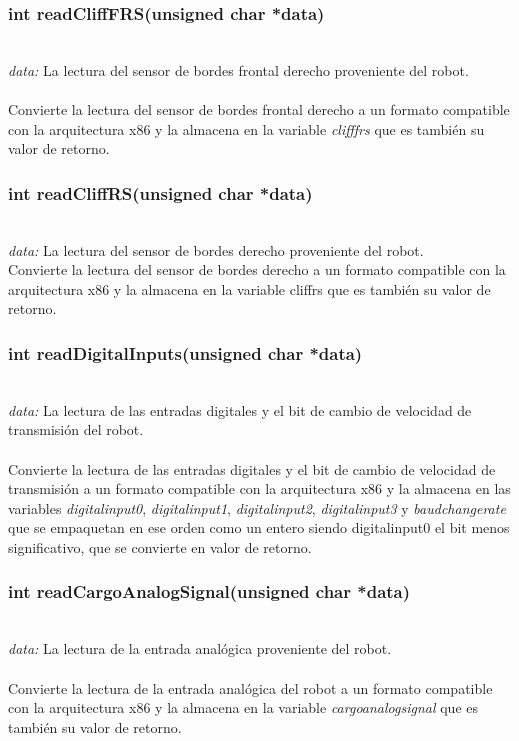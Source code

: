 \documentclass[letterpaper]{book}
\begin{document}
\subsubsection{int readCliffFRS(unsigned char *data)}\mbox{}\\
\emph{data: }La lectura del sensor de bordes frontal derecho proveniente del robot.\\\\
Convierte la lectura del sensor de bordes frontal derecho a un formato compatible con la arquitectura x86 y la almacena en la variable \emph{clifffrs} que es también su valor de retorno.\\ 

\subsubsection{int readCliffRS(unsigned char *data)}\mbox{}\\
\emph{data: }La lectura del sensor de bordes derecho proveniente del robot.\\
Convierte la lectura del sensor de bordes derecho a un formato compatible con la arquitectura x86 y la almacena en la variable cliffrs que es también su valor de retorno.\\ 

\subsubsection{int readDigitalInputs(unsigned char *data)}\mbox{}\\
\emph{data: }La lectura de las entradas digitales y el bit de cambio de velocidad de transmisión del robot.\\\\
Convierte la lectura de las entradas digitales y el bit de cambio de velocidad de transmisión a un formato compatible con la arquitectura x86 y la almacena en las variables \emph{digitalinput0}, \emph{digitalinput1}, \emph{digitalinput2}, \emph{digitalinput3} y \emph{baudchangerate} que se empaquetan en ese orden como un entero siendo digitalinput0 el bit menos significativo, que se convierte en valor de retorno.\\ 

\subsubsection{int readCargoAnalogSignal(unsigned char *data)}\mbox{}\\
\emph{data: }La lectura de la entrada analógica proveniente del robot.\\\\
Convierte la lectura de la entrada analógica del robot a un formato compatible con la arquitectura x86 y la almacena en la variable \emph{cargoanalogsignal} que es también su valor de retorno.\\ 
\end{document}
